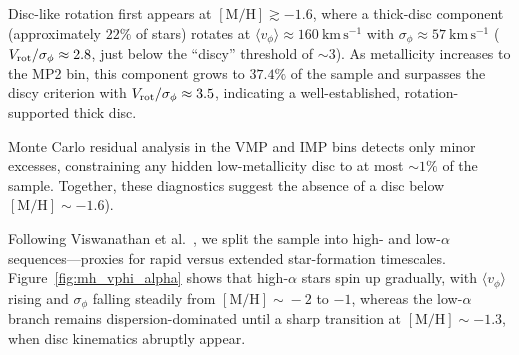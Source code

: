 \documentclass[a4paper,10pt]{article}
\begin{document}
\begin{multicols}{2}
Disc-like rotation first appears at $\mathrm{[M/H]}\gtrsim-1.6$, where a thick-disc 
component (approximately $22\%$ of stars) rotates at $\langle v_\phi\rangle\approx160\ \mathrm{km\,s^{-1}}$ 
with $\sigma_\phi\approx57\ \mathrm{km\,s^{-1}}$ ($V_{\rm rot}/\sigma_\phi\approx2.8$, just 
below the “discy” threshold of $\sim3$). As metallicity increases to the MP2 bin, this component 
grows to $37.4\%$ of the sample and surpasses the discy criterion with 
$V_{\rm rot}/\sigma_\phi\approx3.5$, indicating a well-established, rotation-supported thick disc.  



Monte Carlo residual analysis in the VMP and IMP bins detects only minor excesses, 
constraining any hidden low-metallicity disc to at most $\sim1\%$ of the sample. Together, these diagnostics suggest the 
absence of a disc below $\mathrm{[M/H]}\sim-1.6$).  


Following Viswanathan et al.~\cite{Vis2024}, we split the sample into high- and low-$\alpha$ sequences—proxies for 
rapid versus extended star-formation timescales. Figure~\ref{fig:mh_vphi_alpha} shows that high-$\alpha$ stars 
spin up gradually, with $\langle v_\phi\rangle$ rising and $\sigma_\phi$ falling steadily from 
$\mathrm{[M/H]}\!\sim\!-2$ to $-1$, whereas the low-$\alpha$ branch remains dispersion-dominated until a 
sharp transition at $\mathrm{[M/H]}\sim-1.3$, when disc kinematics abruptly appear.  


\end{multicols}
\end{document}
